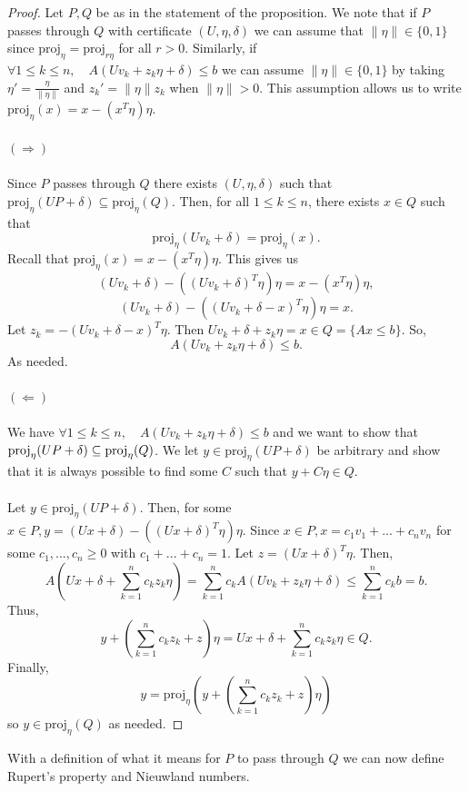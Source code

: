 \documentclass[a4paper]{amsart}
\theoremstyle{remark}
\begin{document}
\begin{proof}
	Let $P, Q$ be as in the statement of the proposition. We note that if $P$ passes through $Q$ with certificate $(U, \eta, \delta)$ we can assume that $\|\eta\|\in\{0,1\}$ since $\textrm{proj}_\eta=\textrm{proj}_{r\eta}$ for all $r>0$. Similarly, if $\forall 1\leq k\leq n, \quad A(Uv_k+z_k\eta+\delta)\leq b$ we can assume $\|\eta\|\in\{0,1\}$ by taking $\eta'=\frac{\eta}{\|\eta\|}$ and $z_k'=\|\eta\|z_k$ when $\|\eta\|>0$. This assumption allows us to write $\textrm{proj}_\eta(x)=x-(x^T\eta)\eta$.
	\\\\
	$(\Longrightarrow)$
	\\\\
	Since $P$ passes through $Q$ there exists $(U,\eta,\delta)$ such that $\textrm{proj}_\eta(UP+\delta)\subseteq \textrm{proj}_\eta(Q)$. Then, for all $1\leq k\leq n$, there exists $x\in Q$ such that
	$$\textrm{proj}_\eta(Uv_k + \delta)=\textrm{proj}_\eta(x).$$
    Recall that $\textrm{proj}_\eta(x)=x-(x^T\eta)\eta$. This gives us
	$$(Uv_k+\delta)-((Uv_k+\delta)^T\eta)\eta=x-(x^T\eta)\eta,$$
	$$(Uv_k+\delta)-((Uv_k+\delta-x)^T\eta)\eta=x.$$
	Let $z_k=-(Uv_k+\delta-x)^T\eta$. Then $Uv_k+\delta+z_k\eta=x\in Q=\{Ax \leq b\}$. So, 
	$$A(Uv_k+z_k\eta+\delta)\leq b.$$
    As needed.
    \\\\
	$(\Longleftarrow)$
	\\\\
    We have $\forall 1 \leq k \leq n, \quad A(Uv_k+z_k \eta + \delta) \leq b$ and we want to show that $\textup{proj}_{\eta}(UP+\delta)\subseteq \textup{proj}_{\eta}(Q)$. We let $y\in \textrm{proj}_\eta(UP+\delta)$ be arbitrary and show that it is always possible to find some $C$ such that $y+C\eta \in Q$.\\\\
	Let $y\in \textrm{proj}_\eta(UP+\delta)$. Then, for some $x\in P, y=(Ux+\delta)-((Ux+\delta)^T\eta)\eta$. Since $x\in P,x=c_1v_1+...+c_nv_n$ for some $c_1,...,c_n\geq0$ with $c_1+...+c_n=1$. Let $z=(Ux+\delta)^T\eta$. Then,
	$$A\left(Ux+\delta+\sum_{k=1}^nc_kz_k\eta\right)=\sum_{k=1}^nc_kA(Uv_k+z_k\eta+\delta) \leq \sum_{k=1}^nc_kb=b.$$
	Thus, 
	$$y+\left(\sum_{k=1}^nc_kz_k+z\right)\eta=Ux+\delta+\sum_{k=1}^nc_kz_k\eta\in Q.$$
	Finally,
	$$y=\textrm{proj}_\eta\left(y+\left(\sum_{k=1}^nc_kz_k+z\right)\eta\right)$$ so
	$y\in \textrm{proj}_\eta(Q)$ as needed.
\end{proof}
\noindent
With a definition of what it means for $P$ to pass through $Q$ we can now define Rupert's property and Nieuwland numbers. 
\end{document}
